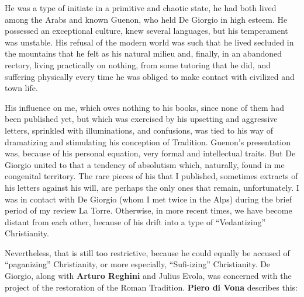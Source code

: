 \begin{quotex}
He was a type of initiate in a primitive and chaotic state, he had both lived among the Arabs and known Guenon, who held De Giorgio in high esteem. He possessed an exceptional culture, knew several languages, but his temperament was unstable. His refusal of the modern world was such that he lived secluded in the mountains that he felt as his natural milieu and, finally, in an abandoned rectory, living practically on nothing, from some tutoring that he did, and suffering physically every time he was obliged to make contact with civilized and town life.

His influence on me, which owes nothing to his books, since none of them had been published yet, but which was exercised by his upsetting and aggressive letters, sprinkled with illuminations, and confusions, was tied to his way of dramatizing and stimulating his conception of Tradition. Guenon's presentation was, because of his personal equation, very formal and intellectual traits. But De Giorgio united to that a tendency of absolutism which, naturally, found in me congenital territory. The rare pieces of his that I published, sometimes extracts of his letters against his will, are perhaps the only ones that remain, unfortunately. I was in contact with De Giorgio (whom I met twice in the Alps) during the brief period of my review La Torre. Otherwise, in more recent times, we have become distant from each other, because of his drift into a type of ``Vedantizing'' Christianity.
\end{quotex}


Nevertheless, that is still too restrictive, because he could equally be accused of ``paganizing'' Christianity, or more especially, ``Sufi-izing'' Christianity. De Giorgio, along with \textbf{Arturo Reghini} and Julius Evola, was concerned with the project of the restoration of the Roman Tradition. \textbf{Piero di Vona} describes this:

